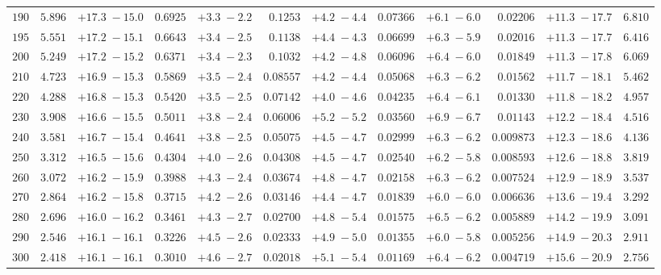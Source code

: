 \begin{landscape}
\begin{table}
\begin{center}
\begin{tabular}{r|rc|rc|rc|rc|rc|r}
 $ 190$ & $  5.896$ & $ +17.3 \; -\!15.0$ & $ 0.6925$ & $ +3.3 \; -\!2.2$ & $ 0.1253$ & $ +4.2 \; -\!4.4$ & $0.07366$ & $ +6.1 \; -\!6.0$ & $ 0.02206$ & $ +11.3 \; -\!17.7$ & $     6.810$ \\ 
 $ 195$ & $  5.551$ & $ +17.2 \; -\!15.1$ & $ 0.6643$ & $ +3.4 \; -\!2.5$ & $ 0.1138$ & $ +4.4 \; -\!4.3$ & $0.06699$ & $ +6.3 \; -\!5.9$ & $ 0.02016$ & $ +11.3 \; -\!17.7$ & $     6.416$ \\ 
 $ 200$ & $  5.249$ & $ +17.2 \; -\!15.2$ & $ 0.6371$ & $ +3.4 \; -\!2.3$ & $ 0.1032$ & $ +4.2 \; -\!4.8$ & $0.06096$ & $ +6.4 \; -\!6.0$ & $ 0.01849$ & $ +11.3 \; -\!17.8$ & $     6.069$ \\ 
 $ 210$ & $  4.723$ & $ +16.9 \; -\!15.3$ & $ 0.5869$ & $ +3.5 \; -\!2.4$ & $0.08557$ & $ +4.2 \; -\!4.4$ & $0.05068$ & $ +6.3 \; -\!6.2$ & $ 0.01562$ & $ +11.7 \; -\!18.1$ & $     5.462$ \\ 
 $ 220$ & $  4.288$ & $ +16.8 \; -\!15.3$ & $ 0.5420$ & $ +3.5 \; -\!2.5$ & $0.07142$ & $ +4.0 \; -\!4.6$ & $0.04235$ & $ +6.4 \; -\!6.1$ & $ 0.01330$ & $ +11.8 \; -\!18.2$ & $     4.957$ \\ 
 $ 230$ & $  3.908$ & $ +16.6 \; -\!15.5$ & $ 0.5011$ & $ +3.8 \; -\!2.4$ & $0.06006$ & $ +5.2 \; -\!5.2$ & $0.03560$ & $ +6.9 \; -\!6.7$ & $ 0.01143$ & $ +12.2 \; -\!18.4$ & $     4.516$ \\ 
 $ 240$ & $  3.581$ & $ +16.7 \; -\!15.4$ & $ 0.4641$ & $ +3.8 \; -\!2.5$ & $0.05075$ & $ +4.5 \; -\!4.7$ & $0.02999$ & $ +6.3 \; -\!6.2$ & $0.009873$ & $ +12.3 \; -\!18.6$ & $     4.136$ \\ 
 $ 250$ & $  3.312$ & $ +16.5 \; -\!15.6$ & $ 0.4304$ & $ +4.0 \; -\!2.6$ & $0.04308$ & $ +4.5 \; -\!4.7$ & $0.02540$ & $ +6.2 \; -\!5.8$ & $0.008593$ & $ +12.6 \; -\!18.8$ & $     3.819$ \\ 
 $ 260$ & $  3.072$ & $ +16.2 \; -\!15.9$ & $ 0.3988$ & $ +4.3 \; -\!2.4$ & $0.03674$ & $ +4.8 \; -\!4.7$ & $0.02158$ & $ +6.3 \; -\!6.2$ & $0.007524$ & $ +12.9 \; -\!18.9$ & $     3.537$ \\ 
 $ 270$ & $  2.864$ & $ +16.2 \; -\!15.8$ & $ 0.3715$ & $ +4.2 \; -\!2.6$ & $0.03146$ & $ +4.4 \; -\!4.7$ & $0.01839$ & $ +6.0 \; -\!6.0$ & $0.006636$ & $ +13.6 \; -\!19.4$ & $     3.292$ \\ 
 $ 280$ & $  2.696$ & $ +16.0 \; -\!16.2$ & $ 0.3461$ & $ +4.3 \; -\!2.7$ & $0.02700$ & $ +4.8 \; -\!5.4$ & $0.01575$ & $ +6.5 \; -\!6.2$ & $0.005889$ & $ +14.2 \; -\!19.9$ & $     3.091$ \\ 
 $ 290$ & $  2.546$ & $ +16.1 \; -\!16.1$ & $ 0.3226$ & $ +4.5 \; -\!2.6$ & $0.02333$ & $ +4.9 \; -\!5.0$ & $0.01355$ & $ +6.0 \; -\!5.8$ & $0.005256$ & $ +14.9 \; -\!20.3$ & $     2.911$ \\ 
 $ 300$ & $  2.418$ & $ +16.1 \; -\!16.1$ & $ 0.3010$ & $ +4.6 \; -\!2.7$ & $0.02018$ & $ +5.1 \; -\!5.4$ & $0.01169$ & $ +6.4 \; -\!6.2$ & $0.004719$ & $ +15.6 \; -\!20.9$ & $     2.756$ \\ 
\hline
	\end{tabular}
	\label{tab:XS7a}
	\end{center}
\end{table}
\end{landscape}


